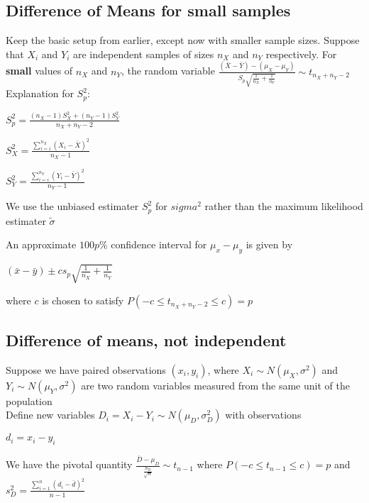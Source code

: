    \subsection{Difference of Means for small samples}
      Keep the basic setup from earlier, except now with smaller sample sizes. Suppose that $X_i$ and $Y_i$ are independent samples of sizes $n_X$ and $n_Y$ respectively. For \textbf{small} values of $n_X$ and $n_Y$, the random variable
      $\frac{(\bar{X} - \bar{Y}) - (\mu_X - \mu_Y)}{S_p\sqrt{\frac{1}{n_X} + \frac{1}{n_Y}}} \sim t_{n_X + n_Y - 2}$
      Explanation for $S^2_p$:
      \begin{center}$S^2_p = \frac{(n_X - 1) S^2_X + (n_Y - 1) S^2_Y}{n_X + n_Y - 2}$\end{center}
      \begin{center}$S^2_X = \frac{\sum_{i=i}^{n_X} (X_i - \bar{X})^2}{n_X - 1}$\end{center}
      \begin{center}$S^2_Y = \frac{\sum_{i=i}^{n_Y} (Y_i - \bar{Y})^2}{n_Y - 1}$\end{center}

        We use the unbiased estimater $S^2_p$ for $sigma^2$ rather than the maximum likelihood estimater $\widetilde{\sigma}$

        An approximate $100p\%$ confidence interval for $\mu_x - \mu_y$ is given by
        \begin{center}$(\bar{x} - \bar{y}) \pm cs_p\sqrt{\frac{1}{n_X} + \frac{1}{n_Y}}$\end{center}
          where $c$ is chosen to satisfy $P(-c \leq t_{n_X + n_Y - 2} \leq c) = p$

    \subsection{Difference of means, not independent}
    Suppose we have paired observations $(x_i, y_i)$, where $X_i \sim N(\mu_X, \sigma^2)$ and $Y_i \sim N(\mu_Y, \sigma^2)$ are two random variables measured from the same unit of the population\\

    Define new variables $D_i = X_i - Y_i \sim N(\mu_D, \sigma^2_D)$ with observations
    \begin{center}$d_i = x_i - y_i$\end{center}

    We have the pivotal quantity $\frac{\bar{D} - \mu_D}{\frac{S_D}{\sqrt{n}}} \sim t_{n-1}$
    where $P(-c \leq t_{n-1} \leq c) = p$ and $s^2_D = \frac{\sum_{i=1}^{n}(d_i - \bar{d})^2}{n-1}$\\


